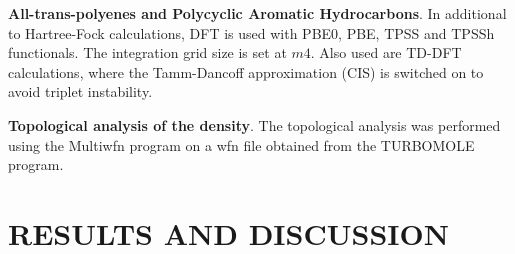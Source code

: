 \documentclass[12pt]{article}
\begin{document}
\textbf{All-trans-polyenes and Polycyclic Aromatic Hydrocarbons}. In additional to Hartree-Fock calculations, DFT is used with PBE0, PBE, TPSS and TPSSh functionals.\cite{pbe0,pbe,tpss,tpssh} The integration grid size is set at \(m4\). Also used are TD-DFT calculations, where the Tamm-Dancoff approximation (CIS) is switched on to avoid triplet instability.\cite{tammdancoff}

\textbf{Topological analysis of the density}. The topological analysis was performed using the Multiwfn
program on a wfn file obtained from the TURBOMOLE program.\cite{multiwfn}


\section*{\sffamily \Large RESULTS AND DISCUSSION}



%
%
\end{document}
